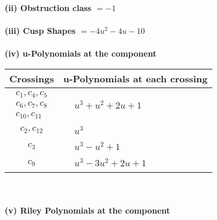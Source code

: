 \documentclass[1p]{elsarticle_modified}
\theoremstyle{definition}
\begin{document}
\flushleft \textbf{(ii) Obstruction class $= -1$}\\~\\
\flushleft \textbf{(iii) Cusp Shapes $= -4 u^2-4 u-10$}\\~\\
\newpage\renewcommand{\arraystretch}{1}
\flushleft \textbf{(iv) u-Polynomials at the component}\newline \\
\begin{tabular}{m{50pt}|m{274pt}}
Crossings & \hspace{64pt}u-Polynomials at each crossing \\
\hline $$\begin{aligned}c_{1},c_{4},c_{5}\\c_{6},c_{7},c_{8}\\c_{10},c_{11}\end{aligned}$$&$\begin{aligned}
&u^3+u^2+2 u+1
\end{aligned}$\\
\hline $$\begin{aligned}c_{2},c_{12}\end{aligned}$$&$\begin{aligned}
&u^3
\end{aligned}$\\
\hline $$\begin{aligned}c_{3}\end{aligned}$$&$\begin{aligned}
&u^3- u^2+1
\end{aligned}$\\
\hline $$\begin{aligned}c_{9}\end{aligned}$$&$\begin{aligned}
&u^3-3 u^2+2 u+1
\end{aligned}$\\
\hline
\end{tabular}\\~\\
\newpage\renewcommand{\arraystretch}{1}
\flushleft \textbf{(v) Riley Polynomials at the component}\newline \\
\end{document}

